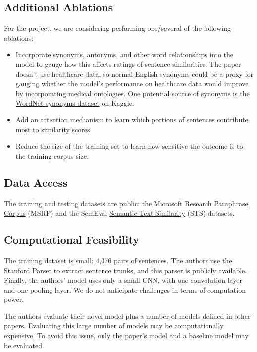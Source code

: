 \documentclass[11pt,a4paper]{article}
\begin{document}
\subsection{Additional Ablations}
For the project, we are considering performing one/several of the following ablations: 
\begin{itemize}
  \item Incorporate synonyms, antonyms, and other word relationships into the model to gauge how this affects ratings of sentence similarities. The paper doesn't use healthcare data, so normal English synonyms could be a proxy for gauging whether the model's performance on healthcare data would improve by incorporating medical ontologies. One potential source of synonyms is the \href{https://www.kaggle.com/datasets/duketemon/wordnet-synonyms}{WordNet synonyms dataset} on Kaggle.
  \item Add an attention mechanism to learn which portions of sentences contribute most to similarity scores.
  \item Reduce the size of the training set to learn how sensitive the outcome is to the training corpus size.
\end{itemize}

\subsection{Data Access}
The training and testing datasets are public: the \href{https://www.microsoft.com/en-us/download/details.aspx?id=52398}{Microsoft Research Paraphrase Corpus} (MSRP) and the SemEval \href{https://github.com/brmson/dataset-sts/tree/master/data/sts/semeval-sts}{Semantic Text Similarity} (STS) datasets.

\subsection{Computational Feasibility}
The training dataset is small: 4,076 pairs of sentences. The authors use the \href{https://nlp.stanford.edu/software/lex-parser.shtml}{Stanford Parser} to extract sentence trunks, and this parser is publicly available. Finally, the authors' model uses only a small CNN, with one convolution layer and one pooling layer. We do not anticipate challenges in terms of computation power. 

The authors evaluate their novel model plus a number of models defined in other papers. Evaluating this large number of models may be computationally expensive. To avoid this issue, only the paper's model and a baseline model may be evaluated.  
\end{document}
